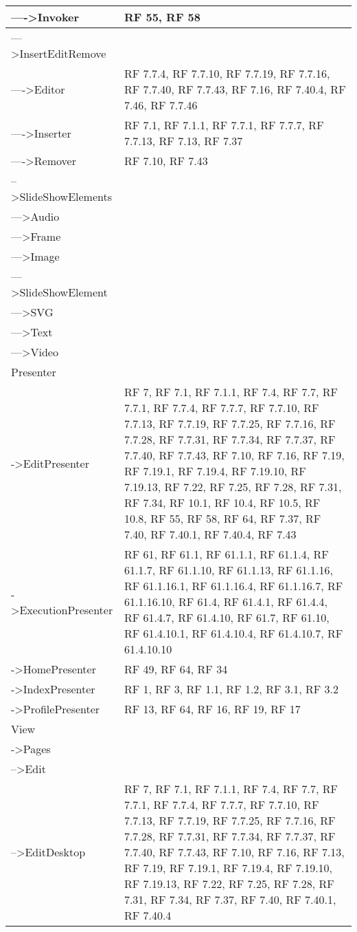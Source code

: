 {\begin{longtable} [c]{| p{8cm} | p{5cm} |}
 \hline 
---->Invoker & RF 55, RF 58\\ 
 \hline 
--->InsertEditRemove & \\ 
 \hline 
---->Editor & RF 7.7.4, RF 7.7.10, RF 7.7.19, RF 7.7.16, RF 7.7.40, RF 7.7.43, RF 7.16, RF 7.40.4, RF 7.46, RF 7.7.46\\ 
 \hline 
---->Inserter & RF 7.1, RF 7.1.1, RF 7.7.1, RF 7.7.7, RF 7.7.13, RF 7.13, RF 7.37\\ 
 \hline 
---->Remover & RF 7.10, RF 7.43\\ 
 \hline 
-->SlideShowElements & \\ 
 \hline 
--->Audio & \\ 
 \hline 
--->Frame & \\ 
 \hline 
--->Image & \\ 
 \hline 
--->SlideShowElement & \\ 
 \hline 
--->SVG & \\ 
 \hline 
--->Text & \\ 
 \hline 
--->Video & \\ 
 \hline 
Presenter & \\ 
 \hline 
->EditPresenter & RF 7, RF 7.1, RF 7.1.1, RF 7.4, RF 7.7, RF 7.7.1, RF 7.7.4, RF 7.7.7, RF 7.7.10, RF 7.7.13, RF 7.7.19, RF 7.7.25, RF 7.7.16, RF 7.7.28, RF 7.7.31, RF 7.7.34, RF 7.7.37, RF 7.7.40, RF 7.7.43, RF 7.10, RF 7.16, RF 7.19, RF 7.19.1, RF 7.19.4, RF 7.19.10, RF 7.19.13, RF 7.22, RF 7.25, RF 7.28, RF 7.31, RF 7.34, RF 10.1, RF 10.4, RF 10.5, RF 10.8, RF 55, RF 58, RF 64, RF 7.37, RF 7.40, RF 7.40.1, RF 7.40.4, RF 7.43\\ 
 \hline 
->ExecutionPresenter & RF 61, RF 61.1, RF 61.1.1, RF 61.1.4, RF 61.1.7, RF 61.1.10, RF 61.1.13, RF 61.1.16, RF 61.1.16.1, RF 61.1.16.4, RF 61.1.16.7, RF 61.1.16.10, RF 61.4, RF 61.4.1, RF 61.4.4, RF 61.4.7, RF 61.4.10, RF 61.7, RF 61.10, RF 61.4.10.1, RF 61.4.10.4, RF 61.4.10.7, RF 61.4.10.10\\ 
 \hline 
->HomePresenter & RF 49, RF 64, RF 34\\ 
 \hline 
->IndexPresenter & RF 1, RF 3, RF 1.1, RF 1.2, RF 3.1, RF 3.2\\ 
 \hline 
->ProfilePresenter & RF 13, RF 64, RF 16, RF 19, RF 17\\ 
 \hline 
View & \\ 
 \hline 
->Pages & \\ 
 \hline 
-->Edit & \\ 
 \hline 
-->EditDesktop & RF 7, RF 7.1, RF 7.1.1, RF 7.4, RF 7.7, RF 7.7.1, RF 7.7.4, RF 7.7.7, RF 7.7.10, RF 7.7.13, RF 7.7.19, RF 7.7.25, RF 7.7.16, RF 7.7.28, RF 7.7.31, RF 7.7.34, RF 7.7.37, RF 7.7.40, RF 7.7.43, RF 7.10, RF 7.16, RF 7.13, RF 7.19, RF 7.19.1, RF 7.19.4, RF 7.19.10, RF 7.19.13, RF 7.22, RF 7.25, RF 7.28, RF 7.31, RF 7.34, RF 7.37, RF 7.40, RF 7.40.1, RF 7.40.4\\ 

\end{longtable}}
